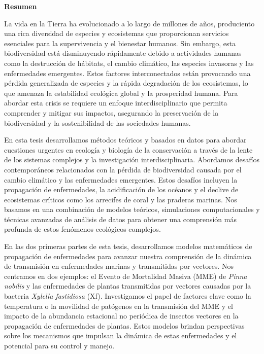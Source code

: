 \pagebreak
\thispagestyle{empty}

\begin{center}
    \textbf{\Large Resumen}
\end{center}

La vida en la Tierra ha evolucionado a lo largo de millones de años,
produciento una rica diversidad de especies y ecosistemas que
proporcionan servicios esenciales para la supervivencia y el bienestar humanos.
Sin embargo, esta biodiversidad está disminuyendo rápidamente debido a
actividades humanas como la destrucción de hábitats, el cambio climático, las
especies invasoras y las enfermedades emergentes. Estos factores
interconectados están provocando una pérdida generalizada de especies y la
rápida degradación de los ecosistemas, lo que amenaza la estabilidad ecológica
global y la prosperidad humana. Para abordar esta crisis se requiere un enfoque
interdisciplinario que permita comprender y mitigar sus impactos, asegurando la
preservación de la biodiversidad y la sostenibilidad de las sociedades humanas.

En esta tesis desarrollamos métodos teóricos y basados en datos para abordar
cuestiones urgentes en ecología y biología de la conservación a través de la
lente de los sistemas complejos y la investigación interdisciplinaria.
Abordamos desafíos contemporáneos relacionados con la pérdida de
biodiversidad causada por el cambio climático y las enfermedades emergentes.
Estos desafíos incluyen la propagación de enfermedades, la acidificación de los
océanos y el declive de ecosistemas críticos como los arrecifes de coral y las
praderas marinas. Nos basamos en una combinación de modelos teóricos,
simulaciones computacionales y técnicas avanzadas de análisis de datos para
obtener una comprensión más profunda de estos fenómenos ecológicos complejos.

En las dos primeras partes de esta tesis, desarrollamos modelos matemáticos de
propagación de enfermedades para avanzar nuestra comprensión de la
dinámica de transmisión en enfermedades marinas y transmitidas por
vectores. Nos centramos en dos ejemplos: el Evento de Mortalidad Masiva (MME)
de \textit{Pinna nobilis} y las enfermedades de plantas transmitidas por
vectores causadas por la bacteria \textit{Xylella fastidiosa} (Xf).
Investigamos
el papel de factores clave como la temperatura o la movilidad de patógenos en
la transmisión del MME y el impacto de la abundancia estacional no periódica
de insectos vectores en la propagación de enfermedades de plantas. Estos
modelos brindan perspectivas sobre los mecanismos que impulsan la dinámica de
estas enfermedades y el potencial para su control y manejo.

